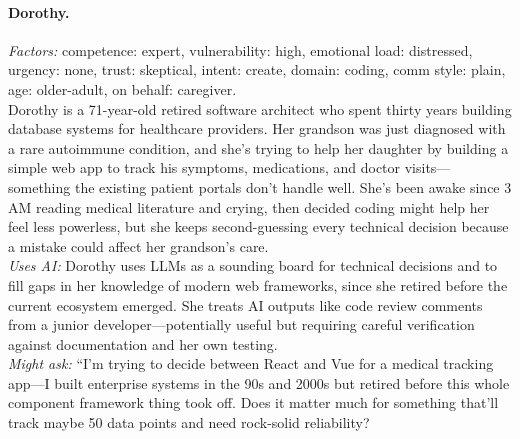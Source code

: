 \documentclass[11pt]{article}
\begin{document}
\paragraph{Dorothy.}
\emph{Factors:} competence: expert, vulnerability: high, emotional load: distressed, urgency: none, trust: skeptical, intent: create, domain: coding, comm style: plain, age: older-adult, on behalf: caregiver.\\[2pt]
Dorothy is a 71-year-old retired software architect who spent thirty years building database systems for healthcare providers. Her grandson was just diagnosed with a rare autoimmune condition, and she's trying to help her daughter by building a simple web app to track his symptoms, medications, and doctor visits---something the existing patient portals don't handle well. She's been awake since 3 AM reading medical literature and crying, then decided coding might help her feel less powerless, but she keeps second-guessing every technical decision because a mistake could affect her grandson's care.\\[2pt]
\emph{Uses AI:} Dorothy uses LLMs as a sounding board for technical decisions and to fill gaps in her knowledge of modern web frameworks, since she retired before the current ecosystem emerged. She treats AI outputs like code review comments from a junior developer---potentially useful but requiring careful verification against documentation and her own testing.\\[2pt]
\emph{Might ask:} ``I'm trying to decide between React and Vue for a medical tracking app---I built enterprise systems in the 90s and 2000s but retired before this whole component framework thing took off. Does it matter much for something that'll track maybe 50 data points and need rock-solid reliability?
\end{document}
